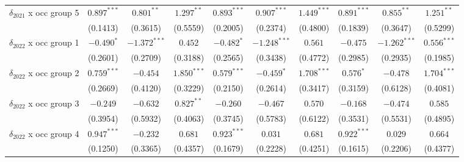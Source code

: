 \begin{tabular}{l|ccc|ccc|ccc}
$\delta_{2021}$ x occ group 5          &           $0.897^{***}$ &    $0.801^{**}$ &    $1.297^{**}$ &            $0.893^{***}$ &   $0.907^{***}$ &   $1.449^{***}$ &            $0.891^{***}$ &    $0.855^{**}$ &    $1.251^{**}$ \\
                                       &                (0.1413) &        (0.3615) &        (0.5559) &                 (0.2005) &        (0.2374) &        (0.4800) &                 (0.1839) &        (0.3647) &        (0.5299) \\
$\delta_{2022}$ x occ group 1          &              $-0.490^*$ &  $-1.372^{***}$ &         $0.452$ &               $-0.482^*$ &  $-1.248^{***}$ &         $0.561$ &                 $-0.475$ &  $-1.262^{***}$ &   $0.556^{***}$ \\
                                       &                (0.2601) &        (0.2709) &        (0.3188) &                 (0.2565) &        (0.3438) &        (0.4772) &                 (0.2985) &        (0.2935) &        (0.1985) \\
$\delta_{2022}$ x occ group 2          &           $0.759^{***}$ &        $-0.454$ &   $1.850^{***}$ &            $0.579^{***}$ &      $-0.459^*$ &   $1.708^{***}$ &                $0.576^*$ &        $-0.478$ &   $1.704^{***}$ \\
                                       &                (0.2669) &        (0.4120) &        (0.3229) &                 (0.2150) &        (0.2614) &        (0.3417) &                 (0.3159) &        (0.6128) &        (0.4081) \\
$\delta_{2022}$ x occ group 3          &                $-0.249$ &        $-0.632$ &    $0.827^{**}$ &                 $-0.260$ &        $-0.467$ &         $0.570$ &                 $-0.168$ &        $-0.474$ &         $0.585$ \\
                                       &                (0.3954) &        (0.5932) &        (0.4063) &                 (0.3745) &        (0.5783) &        (0.6122) &                 (0.3531) &        (0.5531) &        (0.4895) \\
$\delta_{2022}$ x occ group 4          &           $0.947^{***}$ &        $-0.232$ &         $0.681$ &            $0.923^{***}$ &         $0.031$ &         $0.681$ &            $0.922^{***}$ &         $0.029$ &         $0.664$ \\
                                       &                (0.1250) &        (0.3365) &        (0.4357) &                 (0.1679) &        (0.2228) &        (0.4251) &                 (0.1615) &        (0.2206) &        (0.4377) \\

\end{tabular}
